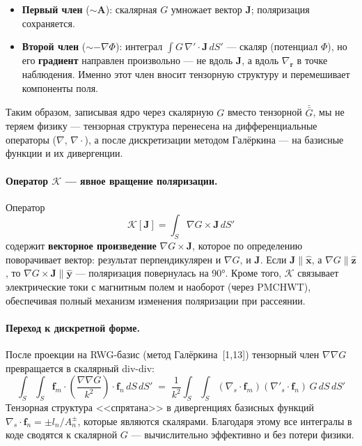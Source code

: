 \documentclass[12pt,a4paper]{article}
\begin{document}
\begin{itemize}
  \item \textbf{Первый член} ($\sim\!\mathbf{A}$): скалярная $G$ умножает вектор $\mathbf{J}$; поляризация сохраняется.
  \item \textbf{Второй член} ($\sim\!{-\nabla\Phi}$): интеграл $\int G\,\nabla'\!\cdot\mathbf{J}\,dS'$ --- скаляр (потенциал $\Phi$), но его \textbf{градиент} направлен произвольно --- не вдоль $\mathbf{J}$, а вдоль $\nabla_{\mathbf{r}}$ в точке наблюдения. Именно этот член вносит тензорную структуру и перемешивает компоненты поля.
\end{itemize}

Таким образом, записывая ядро через скалярную $G$ вместо тензорной $\bar{\bar{G}}$, мы не теряем физику --- тензорная структура перенесена на дифференциальные операторы ($\nabla$, $\nabla\cdot$), а после дискретизации методом Галёркина --- на базисные функции и их дивергенции.

\paragraph{Оператор $\mathcal{K}$ --- явное вращение поляризации.}
Оператор
\begin{equation}
  \mathcal{K}[\mathbf{J}] = \int_S \nabla G \times \mathbf{J} \, dS'
\end{equation}
содержит \textbf{векторное произведение} $\nabla G \times \mathbf{J}$, которое по определению поворачивает вектор: результат перпендикулярен и $\nabla G$, и $\mathbf{J}$. Если $\mathbf{J} \| \hat{\mathbf{x}}$, а $\nabla G \| \hat{\mathbf{z}}$, то $\nabla G \times \mathbf{J} \| \hat{\mathbf{y}}$ --- поляризация повернулась на 90°. Кроме того, $\mathcal{K}$ связывает электрические токи с магнитным полем и наоборот (через PMCHWT), обеспечивая полный механизм изменения поляризации при рассеянии.

\paragraph{Переход к дискретной форме.}
После проекции на RWG-базис (метод Галёркина~[1,13]) тензорный член $\nabla\nabla G$ превращается в скалярный div-div:
\begin{equation}
  \int_S\!\int_S \mathbf{f}_m \cdot \left(\frac{\nabla\nabla G}{k^2}\right) \cdot \mathbf{f}_n \, dS\,dS'
  \;=\; \frac{1}{k^2}\int_S\!\int_S (\nabla_s\!\cdot\mathbf{f}_m)(\nabla'_s\!\cdot\mathbf{f}_n) \, G \, dS\,dS'
\end{equation}
Тензорная структура <<спрятана>> в дивергенциях базисных функций $\nabla_s\!\cdot\mathbf{f}_n = \pm l_n/A_n^\pm$, которые являются скалярами. Благодаря этому все интегралы в коде сводятся к скалярной $G$ --- вычислительно эффективно и без потери физики.
\end{document}
